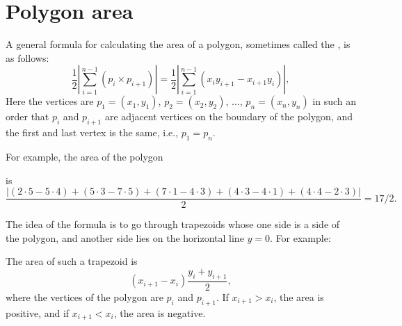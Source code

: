 \section{Polygon area}

A general formula for calculating the area
of a polygon, sometimes called the ,
is as follows: 
\[\frac{1}{2} |\sum_{i=1}^{n-1} (p_i \times p_{i+1})| =
\frac{1}{2} |\sum_{i=1}^{n-1} (x_i y_{i+1} - x_{i+1} y_i)|, \]
Here the vertices are
$p_1=(x_1,y_1)$, $p_2=(x_2,y_2)$, $\ldots$, $p_n=(x_n,y_n)$
in such an order that
$p_i$ and $p_{i+1}$ are adjacent vertices on the boundary
of the polygon,
and the first and last vertex is the same, i.e., $p_1=p_n$.

For example, the area of the polygon
\begin{center}
\end{center}
is
\[\frac{|(2\cdot5-5\cdot4)+(5\cdot3-7\cdot5)+(7\cdot1-4\cdot3)+(4\cdot3-4\cdot1)+(4\cdot4-2\cdot3)|}{2} = 17/2.\]

The idea of the formula is to go through trapezoids
whose one side is a side of the polygon,
and another side lies on the horizontal line $y=0$.
For example:
\begin{center}
\end{center}
The area of such a trapezoid is
\[(x_{i+1}-x_{i}) \frac{y_i+y_{i+1}}{2},\]
where the vertices of the polygon are $p_i$ and $p_{i+1}$.
If $x_{i+1}>x_{i}$, the area is positive,
and if $x_{i+1}<x_{i}$, the area is negative.

